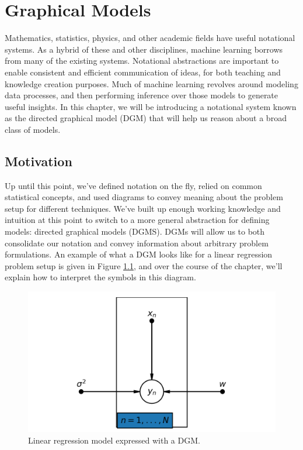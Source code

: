 \chapter{Graphical Models}
Mathematics, statistics, physics, and other academic fields have useful notational systems. As a hybrid of these and other disciplines, machine learning borrows from many of the existing systems. Notational abstractions are important to enable consistent and efficient communication of ideas, for both teaching and knowledge creation purposes. Much of machine learning revolves around modeling data processes, and then performing inference over those models to generate useful insights. In this chapter, we will be introducing a notational system known as the directed graphical model (DGM) that will help us reason about a broad class of models.

\section{Motivation}
Up until this point, we've defined notation on the fly, relied on common statistical concepts, and used diagrams to convey meaning about the problem setup for different techniques. We've built up enough working knowledge and intuition at this point to switch to a more general abstraction for defining models: directed graphical models (DGMS). DGMs will allow us to both consolidate our notation and convey information about arbitrary problem formulations. An example of what a DGM looks like for a linear regression problem setup is given in Figure \ref{fig:lin-reg-dgm}, and over the course of the chapter, we'll explain how to interpret the symbols in this diagram.
\begin{figure}
    \centering
    \includegraphics[width=0.5\paperwidth]{../GraphicalModels/fig/LinearRegressionDGM.png}
    \caption{Linear regression model expressed with a DGM.}
    \label{fig:lin-reg-dgm}
\end{figure}

